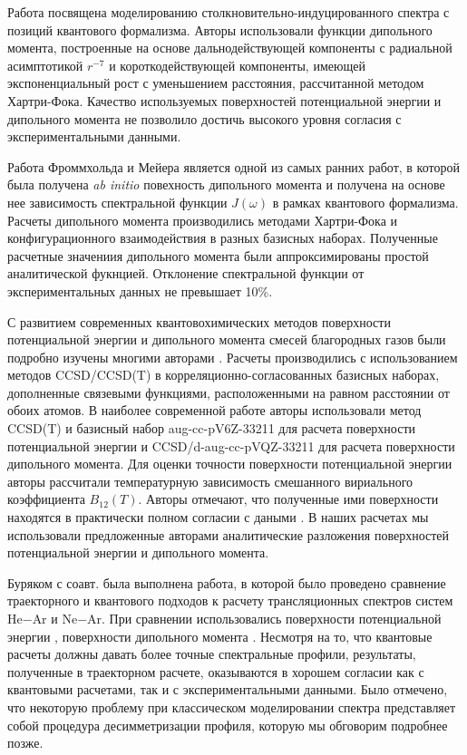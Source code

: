 Работа \cite{sharma1975} посвящена моделированию столкновительно-индуцированного спектра с позиций квантового формализма. Авторы использовали функции дипольного момента, построенные на основе дальнодействующей компоненты с радиальной асимптотикой $r^{-7}$ и короткодействующей компоненты, имеющей экспоненциальный рост с уменьшением расстояния, рассчитанной методом Хартри-Фока. Качество используемых поверхностей потенциальной энергии и дипольного момента не позволило достичь высокого уровня согласия с экспериментальными данными. \par
Работа \cite{meyer1986} Фроммхольда и Мейера является одной из самых ранних работ, в которой была получена \textit{ab initio} повехность дипольного момента и получена на основе нее зависимость спектральной функции $J(\omega)$ в рамках квантового формализма. Расчеты дипольного момента производились методами Хартри-Фока и конфигурационного взаимодействия в разных базисных наборах. Полученные расчетные значениия дипольного момента были аппроксимированы простой аналитической фукнцией. Отклонение спектральной функции от экспериментальных данных не превышает 10\%. \par 
С развитием современных квантовохимических методов поверхности потенциальной энергии и дипольного момента смесей благородных газов были подробно изучены многими авторами \cite{cybulski1999, giece2003, fernandez2004}. Расчеты производились с использованием методов CCSD/CCSD(T) в корреляционно-согласованных базисных наборах, дополненные связевыми функциями, расположенными на равном расстоянии от обоих атомов. В наиболее современной работе\cite{fernandez2004} авторы использовали метод CCSD(T) и базисный набор aug-cc-pV6Z-33211 для расчета поверхности потенциальной энергии и CCSD/d-aug-cc-pVQZ-33211 для расчета поверхности дипольного момента. Для оценки точности поверхности потенциальной энергии авторы рассчитали температурную зависимость смешанного вириального коэффициента $B_{12}(T)$. Авторы отмечают, что полученные ими поверхности находятся в практически полном согласии с даными \cite{cybulski1999}. В наших расчетах мы использовали предложенные авторами аналитические разложения поверхностей потенциальной энергии и дипольного момента. \par
Буряком с соавт. \cite{buryak2014} была выполнена работа, в которой было проведено сравнение траекторного и квантового подходов к расчету трансляционных спектров систем He$-$Ar и Ne$-$Ar. При сравнении использовались поверхности потенциальной энергии \cite{fernandez2004}, поверхности дипольного момента \cite{fernandez2004, meyer1986}. Несмотря на то, что квантовые расчеты должны давать более точные спектральные профили, результаты, полученные в траекторном расчете, оказываются в хорошем согласии как с квантовыми расчетами, так и с экспериментальными данными. Было отмечено, что некоторую проблему при классическом моделировании спектра представляет собой процедура десимметризации профиля, которую мы обговорим подробнее позже. \par

